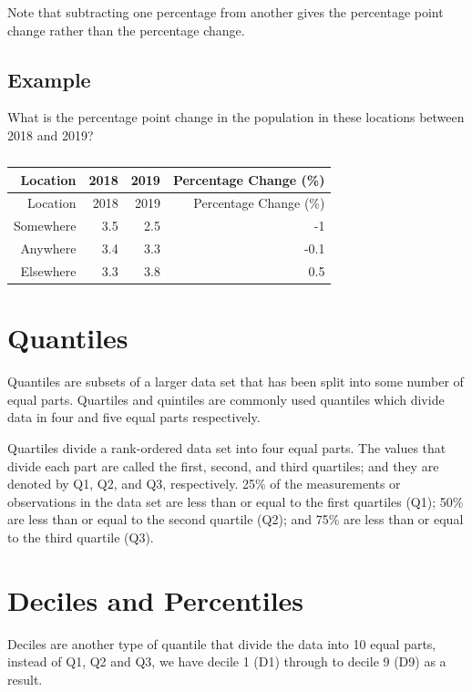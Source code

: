 \documentclass[
]{book}
\begin{document}
Note that subtracting one percentage from another gives the percentage point change rather than the percentage change.

\hypertarget{example-13}{%
\subsection{Example}\label{example-13}}

What is the percentage point change in the population in these locations between 2018 and 2019?

\begin{longtable}[]{@{}rrrr@{}}
\caption{\label{tab:table11}}\tabularnewline
\toprule
Location & 2018 & 2019 & Percentage Change (\%) \\
\midrule
\endfirsthead
\toprule
Location & 2018 & 2019 & Percentage Change (\%) \\
\midrule
\endhead
Somewhere & 3.5 & 2.5 & -1 \\
Anywhere & 3.4 & 3.3 & -0.1 \\
Elsewhere & 3.3 & 3.8 & 0.5 \\
\bottomrule
\end{longtable}

\hypertarget{quantiles}{%
\section{Quantiles}\label{quantiles}}

Quantiles are subsets of a larger data set that has been split into some number of equal parts. Quartiles and quintiles are commonly used quantiles which divide data in four and five equal parts respectively.

Quartiles divide a rank-ordered data set into four equal parts. The values that divide each part are called the first, second, and third quartiles; and they are denoted by Q1, Q2, and Q3, respectively. 25\% of the measurements or observations in the data set are less than or equal to the first quartiles (Q1); 50\% are less than or equal to the second quartile (Q2); and 75\% are less than or equal to the third quartile (Q3).

\hypertarget{deciles-and-percentiles}{%
\section{Deciles and Percentiles}\label{deciles-and-percentiles}}

Deciles are another type of quantile that divide the data into 10 equal parts, instead of Q1, Q2 and Q3, we have decile 1 (D1) through to decile 9 (D9) as a result.
\end{document}
